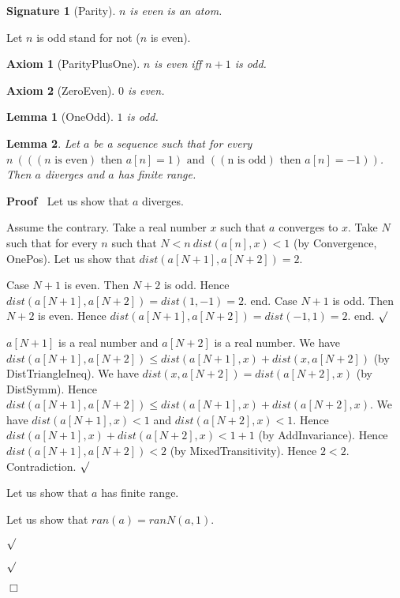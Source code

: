 \documentclass{article}
\newenvironment{forthel}{\begin{leftbar}}{\end{leftbar}}
\newenvironment{proof}{\noindent\textbf{Proof\ }}{\hspace*{\fill}$\Box$\medskip}
\newenvironment{subproof}{\begin{list}{}{}
		\item[\text{Proof}]}{\hfill $\surd$ \end{list}}
\newtheorem{axiom}{Axiom}
\newtheorem{lemma}{Lemma}
\newtheorem{signature}{Signature}
\begin{document}
\begin{forthel}
	\begin{signature}[Parity]
	$n$ is even is an atom.
	\end{signature}
	
	\noindent Let $n$ is odd stand for not ($n$ is even).
	
	\begin{axiom}[ParityPlusOne]
	$n$ is even iff $n + 1$ is odd.
	\end{axiom}

	\begin{axiom}[ZeroEven]
	$0$ is even.
	\end{axiom}
	
	\begin{lemma}[OneOdd]
	$1$ is odd.
	\end{lemma} 
	
	\begin{lemma}
	Let $a$ be a sequence such that for every $n \ (((n \text{ is even}) \text{ then } a[n] = 1) \text{ and } ((\text{n is odd}) \text{ then } a[n] = -1))$.
	Then $a$ diverges and $a$ has finite range.
	\end{lemma}
	\begin{proof}
	Let us show that $a$ diverges.
	\begin{subproof}
	Assume the contrary.
	Take a real number $x$ such that $a$ converges to $x$.
	Take $N$ such that for every $n$ such that $N < n \ dist(a[n],x) < 1$ (by Convergence, OnePos).
	Let us show that $dist(a[N + 1],a[N + 2]) = 2$.
	\begin{subproof}
	Case $N + 1$ is even.
	Then $N + 2$ is odd.
	Hence $dist(a[N + 1],a[N + 2]) = dist(1,-1) = 2$.
	end.
	Case $N + 1$ is odd.
	Then $N + 2$ is even.
	Hence $dist(a[N + 1],a[N + 2]) = dist(-1,1) = 2$.
	end.
	\end{subproof}
	$a[N + 1]$ is a real number and $a[N + 2]$ is a real number.
	We have $dist(a[N + 1],a[N + 2]) \leq dist(a[N + 1],x) + dist(x,a[N + 2])$ (by DistTriangleIneq).
	We have $dist(x,a[N + 2]) = dist(a[N + 2],x)$ (by DistSymm).
	Hence $dist(a[N + 1],a[N + 2]) \leq dist(a[N + 1],x) + dist(a[N + 2],x)$.
	We have $dist(a[N + 1],x) < 1$ and $dist(a[N + 2],x) < 1$.
	Hence $dist(a[N + 1],x) + dist(a[N + 2],x) < 1 + 1$ (by AddInvariance).
	Hence $dist(a[N + 1],a[N + 2]) < 2$ (by MixedTransitivity).
	Hence $2 < 2$.
	Contradiction.
	\end{subproof}
	Let us show that $a$ has finite range.
	\begin{subproof}
	Let us show that $ran(a) = ranN(a,1)$.
	\begin{subproof}

\end{subproof}
\end{subproof}
\end{proof}
\end{forthel}
\end{document}
